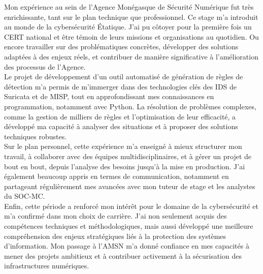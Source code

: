 \vspace{1em}

Mon expérience au sein de l'Agence Monégasque de Sécurité Numérique fut très enrichissante, tant sur le plan technique que professionnel. Ce stage m'a introduit au monde de la cybersécurité Étatique. J'ai pu côtoyer pour la première fois un CERT national et être témoin de leurs missions et organisations au quotidien. Ou encore travailler sur des problématiques concrètes, développer des solutions adaptées à des enjeux réels, et contribuer de manière significative à l'amélioration des processus de l'Agence.\\

Le projet de développement d'un outil automatisé de génération de règles de détection m'a permis de m'immerger dans des technologies clés des IDS de Suricata et de MISP, tout en approfondissant mes connaissances en programmation, notamment avec Python. La résolution de problèmes complexes, comme la gestion de milliers de règles et l'optimisation de leur efficacité, a développé ma capacité à analyser des situations et à proposer des solutions techniques robustes.\\

Sur le plan personnel, cette expérience m'a enseigné à mieux structurer mon travail, à collaborer avec des équipes multidisciplinaires, et à gérer un projet de bout en bout, depuis l'analyse des besoins jusqu'à la mise en production. J'ai également beaucoup appris en termes de communication, notamment en partageant régulièrement mes avancées avec mon tuteur de stage et les analystes du SOC-MC.\\

Enfin, cette période a renforcé mon intérêt pour le domaine de la cybersécurité et m'a confirmé dans mon choix de carrière. J'ai non seulement acquis des compétences techniques et méthodologiques, mais aussi développé une meilleure compréhension des enjeux stratégiques liés à la protection des systèmes d'information. Mon passage à l'AMSN m'a donné confiance en mes capacités à mener des projets ambitieux et à contribuer activement à la sécurisation des infrastructures numériques.